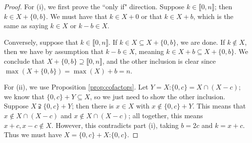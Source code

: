 \documentclass{report}
\newcommand{\llb}{\llbracket}
\newcommand{\rrb}{\rrbracket}
\renewcommand{\:}{\text{:}}
\theoremstyle{definition}
\begin{document}
\begin{proof}
	For (i), we first prove the ``only if" direction.  
	Suppose $k\in \llb 0,n \rrb$; then $k\in X + \{0,b\}$.
	We must have that $k\in X + 0$ or that $k \in X + b$, which is the same as saying $k\in X$ or $k-b\in X$.
	
	Conversely, suppose that $k\in \llb 0,n \rrb$.
	If $k\in X \subseteq X + \{0,b\}$, we are done.
	If $k\notin X$, then we have by assumption that $k-b\in X$, meaning $k\in X +b \subseteq X+ \{0,b\}$.
	We conclude that $X + \{0,b\} \supseteq \llb 0,n \rrb$, and the other inclusion is clear since $\max(X+\{0,b\}) = \max(X) + b = n$.
	
	For (ii), we use Proposition \ref{prop:cofactors}.
	Let $Y = X\:\{0,c\} = X\cap (X-c)$; we know that $\{0,c\} + Y \subseteq X$, so we just need to show the other inclusion.
	Suppose $X \supsetneqq \{0,c\} + Y$; then there is $x\in X$ with $x\notin \{0,c\} + Y$.
	This means that $x\notin X \cap (X-c)$ and $x \notin X \cap (X-c)$; all together, this means $x+c,x-c\notin X$.
	However, this contradicts part (i), taking $b = 2c$ and $k = x+c$.
	Thus we must have $X = \{0,c\} + X\:\{0,c\}$.
\end{proof}
\end{document}
